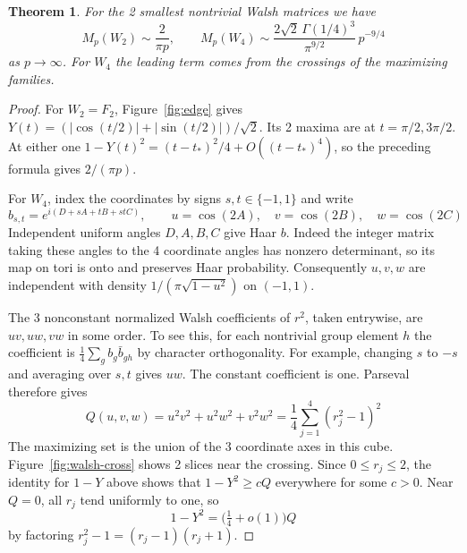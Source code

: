 \documentclass[11pt,a4paper]{article}
\newtheorem{thm}{Theorem}[section]
\theoremstyle{remark}
\begin{document}
\begin{samepage}
\begin{thm}\label{thm:walsh-edge}
For the 2 smallest nontrivial Walsh matrices we have
\[
 M_p(W_2)\sim\frac{2}{\pi p},\qquad
 M_p(W_4)\sim\frac{2\sqrt2\,\Gamma(1/4)^3}{\pi^{9/2}}\,p^{-9/4}
\]
as $p\to\infty$. For $W_4$ the leading term comes from the crossings of
the maximizing families.
\end{thm}
\end{samepage}
\begin{proof}
For $W_2=F_2$, Figure~\ref{fig:edge} gives
$Y(t)=(|\cos(t/2)|+|\sin(t/2)|)/\sqrt2$. Its 2 maxima are at
$t=\pi/2,3\pi/2$. At either one $1-Y(t)^2=(t-t_*)^2/4+O((t-t_*)^4)$,
so the preceding formula gives $2/(\pi p)$.

For $W_4$, index the coordinates by signs $s,t\in\{-1,1\}$ and write
\[
 b_{s,t}=e^{i(D+sA+tB+stC)},\qquad
 u=\cos(2A),\quad v=\cos(2B),\quad w=\cos(2C)
\]
Independent uniform angles $D,A,B,C$ give Haar $b$. Indeed the integer
matrix taking these angles to the 4 coordinate angles has nonzero
determinant, so its map on tori is onto and preserves Haar probability.
Consequently $u,v,w$ are independent with density
$1/(\pi\sqrt{1-u^2})$ on $(-1,1)$.

The 3 nonconstant normalized Walsh coefficients of $r^2$, taken
entrywise, are $uv,uw,vw$ in some order. To see this, for each nontrivial
group element $h$ the coefficient is
$\frac14\sum_g b_g\bar b_{gh}$ by character orthogonality.
For example, changing $s$ to $-s$ and averaging over $s,t$ gives $uw$.
The constant coefficient is one. Parseval therefore gives
\[
 Q(u,v,w)=u^2v^2+u^2w^2+v^2w^2=\frac14\sum_{j=1}^4(r_j^2-1)^2
\]
The maximizing set is the union of the 3 coordinate axes in this
cube. Figure~\ref{fig:walsh-cross} shows 2 slices near the crossing. Since $0\le r_j\le2$, the
identity for $1-Y$ above shows that $1-Y^2\ge cQ$ everywhere for some
$c>0$. Near $Q=0$, all $r_j$ tend uniformly to one, so
\[
 1-Y^2=\big(\tfrac14+o(1)\big)Q
\]
by factoring $r_j^2-1=(r_j-1)(r_j+1)$.


\end{proof}
\end{document}
